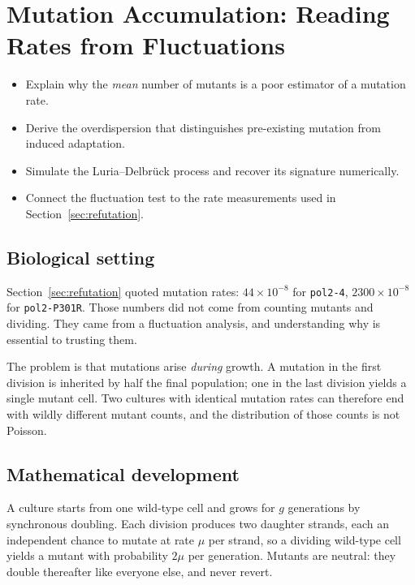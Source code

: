 \section{Mutation Accumulation: Reading Rates from Fluctuations}\label{sec:accumulation}

\begin{objectives}
\begin{itemize}[leftmargin=*,itemsep=1pt,topsep=1pt]
  \item Explain why the \emph{mean} number of mutants is a poor estimator of a mutation rate.
  \item Derive the overdispersion that distinguishes pre-existing mutation from induced adaptation.
  \item Simulate the Luria--Delbrück process and recover its signature numerically.
  \item Connect the fluctuation test to the rate measurements used in Section~\ref{sec:refutation}.
\end{itemize}
\end{objectives}

\subsection{Biological setting}

Section~\ref{sec:refutation} quoted mutation rates: $44 \times 10^{-8}$ for
\texttt{pol2-4}, $2300 \times 10^{-8}$ for \texttt{pol2-P301R}. Those numbers did
not come from counting mutants and dividing. They came from a fluctuation
analysis, and understanding why is essential to trusting them.

The problem is that mutations arise \emph{during} growth. A mutation in the first
division is inherited by half the final population; one in the last division
yields a single mutant cell. Two cultures with identical mutation rates can
therefore end with wildly different mutant counts, and the distribution of those
counts is not Poisson.

\subsection{Mathematical development}

\begin{model}\label{model:ld}
A culture starts from one wild-type cell and grows for $g$ generations by
synchronous doubling. Each division produces two daughter strands, each an
independent chance to mutate at rate $\mu$ per strand, so a dividing wild-type
cell yields a mutant with probability $2\mu$ per generation. Mutants are
neutral: they double thereafter like everyone else, and never revert.
\end{model}

